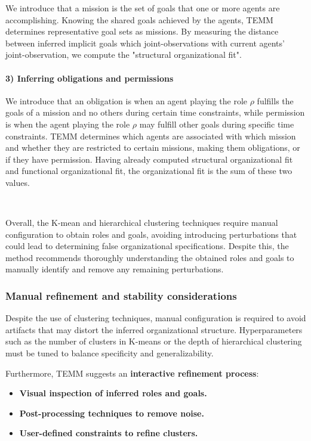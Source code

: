 \documentclass[pdflatex,sn-mathphys-num]{sn-jnl}%
\theoremstyle{thmstyleone}%
\theoremstyle{thmstyletwo}%
\theoremstyle{thmstylethree}%
\begin{document}
We introduce that a mission is the set of goals that one or more agents are accomplishing.
Knowing the shared goals achieved by the agents, TEMM determines representative goal sets as missions.
By measuring the distance between inferred implicit goals which joint-observations with current agents' joint-observation, we compute the "structural organizational fit".

\paragraph{3) Inferring obligations and permissions}

We introduce that an obligation is when an agent playing the role $\rho$ fulfills the goals of a mission and no others during certain time constraints, while permission is when the agent playing the role $\rho$ may fulfill other goals during specific time constraints.
TEMM determines which agents are associated with which mission and whether they are restricted to certain missions, making them obligations, or if they have permission.
Having already computed structural organizational fit and functional organizational fit, the organizational fit is the sum of these two values.

\

Overall, the K-mean and hierarchical clustering techniques require manual configuration to obtain roles and goals, avoiding introducing perturbations that could lead to determining false organizational specifications. Despite this, the method recommends thoroughly understanding the obtained roles and goals to manually identify and remove any remaining perturbations.

\subsubsection{Manual refinement and stability considerations}

Despite the use of clustering techniques, manual configuration is required to avoid artifacts that may distort the inferred organizational structure. Hyperparameters such as the number of clusters in K-means or the depth of hierarchical clustering must be tuned to balance specificity and generalizability.

Furthermore, TEMM suggests an \textbf{interactive refinement process}:
\begin{itemize}
    \item \textbf{Visual inspection of inferred roles and goals.}
    \item \textbf{Post-processing techniques to remove noise.}
    \item \textbf{User-defined constraints to refine clusters.}
\end{itemize}
\end{document}
